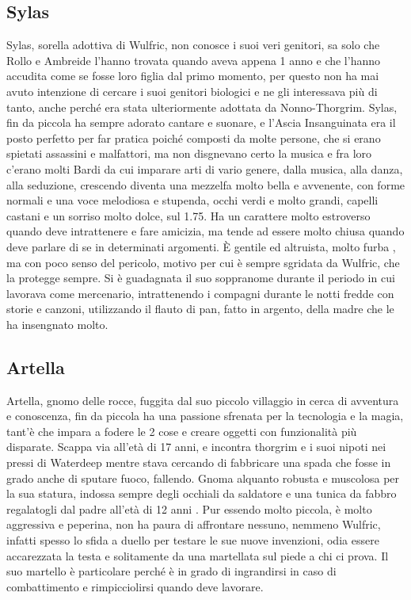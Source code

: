 \documentclass{article}
\begin{document}
          \subsection{Sylas}Sylas, sorella adottiva di Wulfric, non conosce i suoi veri genitori, sa solo che Rollo e Ambreide l'hanno trovata quando aveva appena 1 anno e che l'hanno accudita come se fosse loro figlia dal primo momento, per questo non ha mai avuto intenzione di cercare i suoi genitori biologici e ne gli interessava più di tanto, anche perché era stata ulteriormente adottata da Nonno-Thorgrim. Sylas, fin da piccola ha sempre adorato cantare e suonare, e l'Ascia Insanguinata era il posto perfetto per far pratica poiché composti da molte persone, che si erano spietati assassini e malfattori, ma non disgnevano certo la musica e fra loro c'erano molti Bardi da cui imparare arti di vario genere, dalla musica, alla danza, alla seduzione, crescendo diventa una mezzelfa molto bella e avvenente, con forme normali e una voce melodiosa e stupenda, occhi verdi e molto grandi, capelli castani e un sorriso molto dolce, sul 1.75. Ha un carattere molto estroverso quando deve intrattenere e fare amicizia, ma tende ad essere molto chiusa quando deve parlare di se in determinati argomenti. È gentile ed altruista, molto furba , ma con poco senso del pericolo, motivo per cui è sempre sgridata da Wulfric, che la protegge sempre. Si è guadagnata il suo soppranome durante il periodo in cui lavorava come mercenario, intrattenendo i compagni durante le notti fredde con storie e canzoni, utilizzando il flauto di pan, fatto in argento, della madre che le ha insengnato molto. 
          \subsection{Artella}
Artella, gnomo delle rocce, fuggita dal suo piccolo villaggio in cerca di avventura e conoscenza, fin da piccola ha una passione sfrenata per la tecnologia e la magia, tant'è che impara a fodere le 2 cose e creare oggetti con funzionalità più disparate. Scappa via all'età di 17 anni, e incontra thorgrim e i suoi nipoti nei pressi di Waterdeep mentre stava cercando di fabbricare una spada che fosse in grado anche di sputare fuoco, fallendo. Gnoma alquanto robusta e muscolosa per la sua statura, indossa sempre degli occhiali da saldatore e una tunica da fabbro regalatogli dal padre  all'età di 12 anni . Pur essendo molto piccola, è molto aggressiva e peperina, non ha paura di affrontare nessuno, nemmeno Wulfric, infatti spesso lo sfida a duello per testare le sue nuove invenzioni, odia essere accarezzata la testa e solitamente da una martellata sul piede a chi ci prova. Il suo martello è particolare perché è in grado di ingrandirsi in caso di combattimento e rimpicciolirsi quando deve lavorare. 
\end{document}
